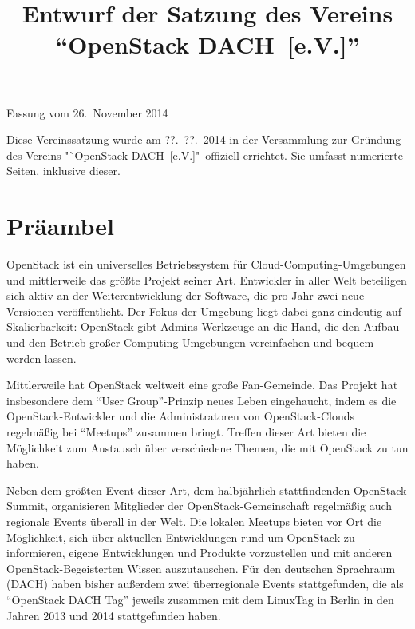 \documentclass[draft]{scrartcl}
\newcommand{\VereinsName}{OpenStack DACH}
\begin{document}

\title{Entwurf der Satzung des Vereins "`\VereinsName\ [e.V.]"'}
\date{}
\author{}
\def\fassungsdatum{26.\ November 2014}

\begin{center}
  \LARGE \thetitle
\end{center}

\begin{flushright}
  Fassung vom \fassungsdatum
\end{flushright}

\pagestyle{scrheadings}
\clearscrheadfoot
{}

{\footnotesize Diese Vereinssatzung wurde am ??.\ ??.\ 2014 in der Versammlung
  zur Gründung des Vereins "`\VereinsName\ [e.V.]"\ offiziell errichtet. Sie
  umfasst \pageref{TotPages} numerierte Seiten, inklusive dieser.}

\bigskip

\section*{Präambel}\enlargethispage{\textheight}
\small

OpenStack ist ein universelles Betriebssystem für Cloud-Computing-Umgebungen
und mittlerweile das größte Projekt seiner Art. Entwickler in aller Welt
beteiligen sich aktiv an der Weiterentwicklung der Software, die pro Jahr
zwei neue Versionen veröffentlicht. Der Fokus der Umgebung liegt dabei ganz
eindeutig auf Skalierbarkeit: OpenStack gibt Admins Werkzeuge an die Hand,
die den Aufbau und den Betrieb großer Computing-Umgebungen vereinfachen
und bequem werden lassen.

Mittlerweile hat OpenStack weltweit eine große Fan-Gemeinde. Das Projekt hat
insbesondere dem "`User Group"'-Prinzip neues Leben eingehaucht, indem es die
OpenStack-Entwickler und die Administratoren von OpenStack-Clouds regelmäßig
bei "`Meetups"' zusammen bringt. Treffen dieser Art bieten die Möglichkeit
zum Austausch über verschiedene Themen, die mit OpenStack zu tun haben.

Neben dem größten Event dieser Art, dem halbjährlich stattfindenden OpenStack
Summit, organisieren Mitglieder der OpenStack-Gemeinschaft regelmäßig auch
regionale Events überall in der Welt. Die lokalen Meetups bieten vor Ort
die Möglichkeit, sich über aktuellen Entwicklungen rund um OpenStack zu
informieren, eigene Entwicklungen und Produkte vorzustellen und mit anderen
OpenStack-Begeisterten Wissen auszutauschen. Für den deutschen Sprachraum
(DACH) haben bisher außerdem zwei überregionale Events stattgefunden, die
als "`OpenStack DACH Tag"' jeweils zusammen mit dem LinuxTag in Berlin in
den Jahren 2013 und 2014 stattgefunden haben.
\end{document}
